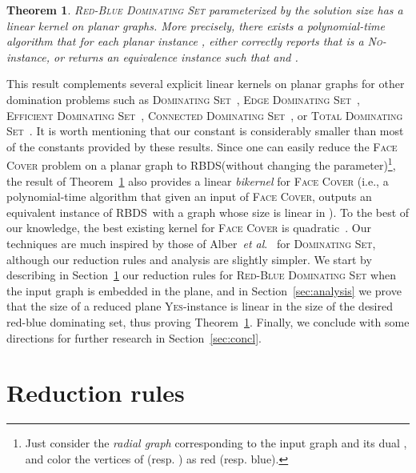\documentclass[a4paper,11pt]{article}
\newcommand{\RBDS}{\textsc{RBDS}\xspace}
\newcommand{\YES}{\textsc{Yes}}
\newtheorem{theorem}{Theorem}\newtheorem{lemma}[theorem]{Lemma}
\begin{document}
\begin{theorem}
\label{th:main}
\textsc{Red-Blue Dominating Set} parameterized by the solution size has a linear kernel on planar graphs. More precisely, there exists a polynomial-time algorithm that for each planar instance , either correctly reports that  is a \textsc{No}-instance, or returns an equivalence instance  such that  and .
\end{theorem}



This result complements several explicit linear kernels on planar graphs for other domination problems such as \textsc{Dominating Set}~\cite{AFN04}, \textsc{Edge Dominating Set}~\cite{WYGC13,GuNi07}, \textsc{Efficient Dominating Set}~\cite{GuNi07}, \textsc{Connected Dominating Set}~\cite{LMS11,GuIm10}, or \textsc{Total Dominating Set}~\cite{GaSa12}. It is worth mentioning that our constant is considerably smaller than most of the constants provided by these results. Since one can easily reduce the \textsc{Face Cover} problem on a planar graph to \RBDS (without changing the parameter)\footnote{Just consider the \emph{radial graph} corresponding to the input graph  and its dual , and color the vertices of  (resp. ) as red (resp. blue). }, the result of Theorem~\ref{th:main} also provides a linear \emph{bikernel} for \textsc{Face Cover} (i.e., a polynomial-time algorithm that given an input
of \textsc{Face Cover}, outputs an equivalent instance of \RBDS\ with a graph whose size is linear in ). To the best of our knowledge, the best existing kernel for \textsc{Face Cover} is quadratic~\cite{KLL02}. Our techniques are much inspired by those of Alber~\emph{et al}.~\cite{AFN04} for \textsc{Dominating Set}, although our reduction rules and analysis are slightly simpler. We start by describing in Section~\ref{sec:RedRules} our reduction rules for \textsc{Red-Blue Dominating Set} when the input graph is embedded in the plane, and in Section~\ref{sec:analysis} we prove that the size of a reduced plane \YES-instance is linear in the size of the desired red-blue dominating set, thus proving Theorem~\ref{th:main}. Finally, we conclude with some directions for further research in Section~\ref{sec:concl}.


\section{Reduction rules} \label{sec:RedRules}
\end{document}
